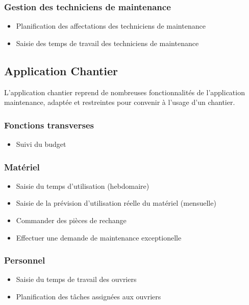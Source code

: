 \subsubsection{Gestion des techniciens de maintenance}
\begin{itemize}
\item Planification des affectations des techniciens de maintenance
\item Saisie des temps de travail des techniciens de maintenance
\end{itemize}


\subsection{Application Chantier}
L'application chantier reprend de nombreuses fonctionnalités de
l'application maintenance, adaptée et restreintes pour convenir à l'usage
d'un chantier.

\subsubsection{Fonctions transverses}
\begin{itemize}
\item Suivi du budget
\end{itemize}

\subsubsection{Matériel}
\begin{itemize}
\item Saisie du temps d'utilisation (hebdomaire)
\item Saisie de la prévision d'utilisation réelle du matériel (mensuelle)
\item Commander des pièces de rechange
\item Effectuer une demande de maintenance exceptionelle
\end{itemize}

\subsubsection{Personnel}
\begin{itemize}
\item Saisie du temps de travail des ouvriers
\item Planification des tâches assignées aux ouvriers
\end{itemize}
